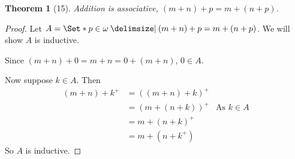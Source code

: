 \documentclass[12pt]{article}
\theoremstyle{plain}
\newtheorem*{exthm}{Theorem}
\theoremstyle{remark}
\theoremstyle{definition}
\theoremstyle{remark}
\providecommand\st{}
\newcommand\SetSymbol[1][]{%
  \nonscript\:#1\vert%
  \allowbreak%
  \nonscript\:
\mathopen{}}
\renewcommand\st{\SetSymbol[\delimsize]}
\begin{document}
\begin{exthm}[15]
  Addition is associative, $(m + n) + p = m + (n + p)$.
\end{exthm}
\begin{proof}
  Let $A = \Set*{p \in \omega \st (m + n) + p = m + (n + p)}$. We will show $A$ is inductive.

  Since $(m + n) + 0 = m + n = 0 + (m + n)$, $0 \in A$.

  Now suppose $k \in A$. Then
  \begin{align*}
    (m + n) + k^+ &= ((m + n) + k)^+\\
                  &= (m + (n + k))^+ &\text{As $k \in A$}\\
                  &= m + (n + k)^+\\
                  &= m + (n + k^+)
  \end{align*}
  So $A$ is inductive.
\end{proof}
\end{document}
